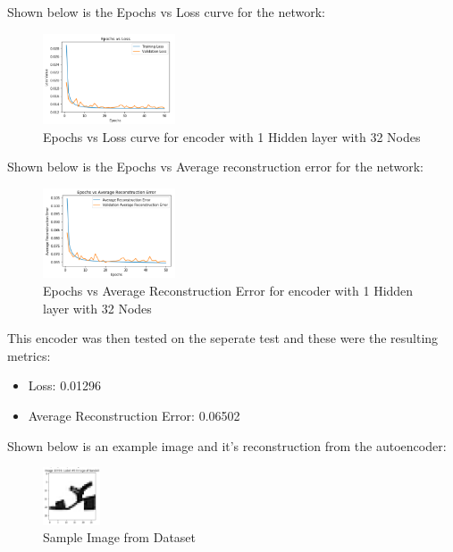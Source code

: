 \documentclass[conference]{IEEEtran}
\begin{document}
    Shown below is the Epochs vs Loss curve for the network:

    \begin{figure}[H]
        \centering
        \captionsetup{justification=centering}
        \centering
            \includegraphics[width=0.35\textwidth]{3.png}
            \caption{Epochs vs Loss curve for encoder with 1 Hidden layer with 32 Nodes}
    \end{figure}

    Shown below is the Epochs vs Average reconstruction error for the network:

    \begin{figure}[H]
        \centering
        \captionsetup{justification=centering}
        \centering
            \includegraphics[width=0.35\textwidth]{4.png}
            \caption{Epochs vs Average Reconstruction Error for encoder with 1 Hidden layer with 32 Nodes}
    \end{figure}

    This encoder was then tested on the seperate test and these were the resulting metrics:

    \begin{itemize}
        \item Loss: 0.01296
        \item Average Reconstruction Error: 0.06502\\
    \end{itemize}

    Shown below is an example image and it's reconstruction from the autoencoder:

    \begin{figure}[H]
        \centering
        \captionsetup{justification=centering}
        \centering
            \includegraphics[width=0.15\textwidth]{5.png}
            \caption{Sample Image from Dataset}
    \end{figure}
\end{document}

